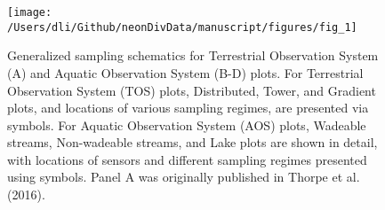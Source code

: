 \documentclass[
  12pt,
]{article}
\begin{document}
\begin{figure}

{\centering \texttt{[image: /Users/dli/Github/neonDivData/manuscript/figures/fig\_1]} 

}

\caption{Generalized sampling schematics for Terrestrial Observation System (A) and Aquatic Observation System (B-D) plots. For Terrestrial Observation System (TOS) plots, Distributed, Tower, and Gradient plots, and locations of various sampling regimes, are presented via symbols. For Aquatic Observation System (AOS) plots, Wadeable streams, Non-wadeable streams, and Lake plots are shown in detail, with locations of sensors and different sampling regimes presented using symbols. Panel A was originally published in Thorpe et al. (2016).}\label{fig:Fig1Design}
\end{figure}
\end{document}

